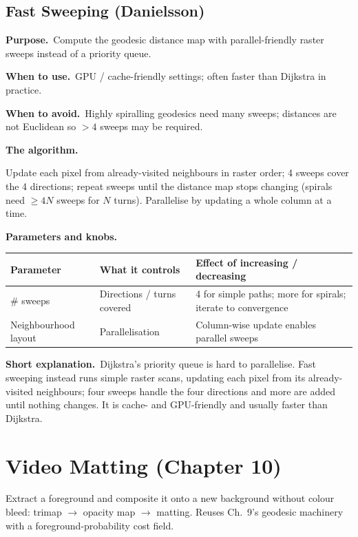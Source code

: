 \documentclass[10pt]{article}
\makeatletter
\newcommand{\Purpose}{\par\smallskip\textbf{Purpose.}\ }
\newcommand{\WhenUse}{\par\textbf{When to use.}\ }
\newcommand{\WhenAvoid}{\par\textbf{When to avoid.}\ }
\newcommand{\TheAlgo}{\par\smallskip\textbf{The algorithm.}\par\nopagebreak}
\newcommand{\Knobs}{\par\smallskip\textbf{Parameters and knobs.}\par\nopagebreak}
\newcommand{\ShortExp}{\par\smallskip\textbf{Short explanation.}\ }
\newenvironment{ptable}{\begin{center}\small\begin{tabular}{@{}p{2.5cm} p{5.9cm} p{6.2cm}@{}}\toprule
Parameter & What it controls & Effect of increasing / decreasing \\ \midrule}
{\bottomrule\end{tabular}\end{center}}
\makeatother
\begin{document}
\subsection{Fast Sweeping (Danielsson)}
\Purpose Compute the geodesic distance map with parallel-friendly raster sweeps instead of a priority
queue.
\WhenUse GPU / cache-friendly settings; often faster than Dijkstra in practice.
\WhenAvoid Highly spiralling geodesics need many sweeps; distances are not Euclidean so $>4$ sweeps may be
required.
\TheAlgo Update each pixel from already-visited neighbours in raster order; 4 sweeps cover the 4 directions;
repeat sweeps until the distance map stops changing (spirals need $\ge4N$ sweeps for $N$ turns). Parallelise
by updating a whole column at a time.
\Knobs
\begin{ptable}
\# sweeps & Directions / turns covered & 4 for simple paths; more for spirals; iterate to convergence \\
Neighbourhood layout & Parallelisation & Column-wise update enables parallel sweeps \\
\end{ptable}
\ShortExp Dijkstra's priority queue is hard to parallelise. Fast sweeping instead runs simple raster scans,
updating each pixel from its already-visited neighbours; four sweeps handle the four directions and more are
added until nothing changes. It is cache- and GPU-friendly and usually faster than Dijkstra.

\newpage
\section{Video Matting (Chapter 10)}
Extract a foreground and composite it onto a new background without colour bleed:
trimap $\to$ opacity map $\to$ matting. Reuses Ch.\ 9's geodesic machinery with a foreground-probability
cost field.

\end{document}
